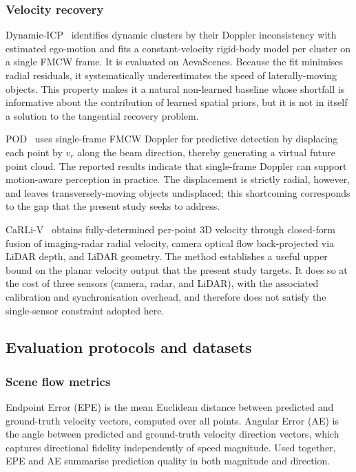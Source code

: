 \documentclass[a4paper,12pt]{article}
\begin{document}
\subsubsection{Velocity recovery}

Dynamic-ICP~\cite{dynamicicp2025} identifies dynamic clusters by their Doppler inconsistency with estimated ego-motion and fits a constant-velocity rigid-body model per cluster on a single FMCW frame. It is evaluated on AevaScenes. Because the fit minimises radial residuals, it systematically underestimates the speed of laterally-moving objects. This property makes it a natural non-learned baseline whose shortfall is informative about the contribution of learned spatial priors, but it is not in itself a solution to the tangential recovery problem.

POD~\cite{pod2025} uses single-frame FMCW Doppler for predictive detection by displacing each point by $v_r$ along the beam direction, thereby generating a virtual future point cloud. The reported results indicate that single-frame Doppler can support motion-aware perception in practice. The displacement is strictly radial, however, and leaves transversely-moving objects undisplaced; this shortcoming corresponds to the gap that the present study seeks to address.

CaRLi-V~\cite{zhou2025carliv} obtains fully-determined per-point 3D velocity through closed-form fusion of imaging-radar radial velocity, camera optical flow back-projected via LiDAR depth, and LiDAR geometry. The method establishes a useful upper bound on the planar velocity output that the present study targets. It does so at the cost of three sensors (camera, radar, and LiDAR), with the associated calibration and synchronisation overhead, and therefore does not satisfy the single-sensor constraint adopted here.

\subsection{Evaluation protocols and datasets}

\subsubsection{Scene flow metrics}

Endpoint Error (EPE) is the mean Euclidean distance between predicted and ground-truth velocity vectors, computed over all points. Angular Error (AE) is the angle between predicted and ground-truth velocity direction vectors, which captures directional fidelity independently of speed magnitude. Used together, EPE and AE summarise prediction quality in both magnitude and direction.
\end{document}

